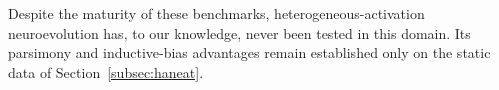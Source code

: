 \documentclass[12pt]{article}
\begin{document}
Despite the maturity of these benchmarks, heterogeneous-activation neuroevolution has, to our knowledge, never been tested in this domain. Its parsimony and inductive-bias advantages remain established only on the static data of Section~\ref{subsec:haneat}.




\end{document}
